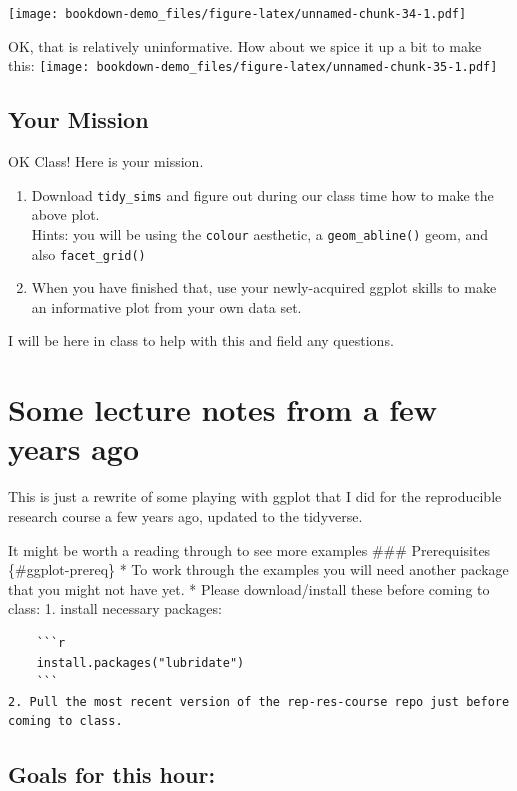 \documentclass[]{book}
\providecommand{\tightlist}{%
  \setlength{\itemsep}{0pt}\setlength{\parskip}{0pt}}
\theoremstyle{definition}
\theoremstyle{definition}
\theoremstyle{remark}
\begin{document}
\texttt{[image: bookdown-demo\_files/figure-latex/unnamed-chunk-34-1.pdf]}

OK, that is relatively uninformative. How about we spice it up a bit to
make this:
\texttt{[image: bookdown-demo\_files/figure-latex/unnamed-chunk-35-1.pdf]}

\subsection{Your Mission}\label{your-mission}

OK Class! Here is your mission.

\begin{enumerate}
\def\labelenumi{\arabic{enumi}.}
\tightlist
\item
  Download \texttt{tidy\_sims} and figure out during our class time how
  to make the above plot.\\
  Hints: you will be using the \texttt{colour} aesthetic, a
  \texttt{geom\_abline()} geom, and also \texttt{facet\_grid()}
\item
  When you have finished that, use your newly-acquired ggplot skills to
  make an informative plot from your own data set.
\end{enumerate}

I will be here in class to help with this and field any questions.

\section{Some lecture notes from a few years
ago}\label{some-lecture-notes-from-a-few-years-ago}

This is just a rewrite of some playing with ggplot that I did for the
reproducible research course a few years ago, updated to the tidyverse.

It might be worth a reading through to see more examples \#\#\#
Prerequisites \{\#ggplot-prereq\} * To work through the examples you
will need another package that you might not have yet. * Please
download/install these before coming to class: 1. install necessary
packages:

\begin{verbatim}
    ```r
    install.packages("lubridate")
    ```
2. Pull the most recent version of the rep-res-course repo just before coming to class.
\end{verbatim}

\subsection{Goals for this hour:}\label{goals-for-this-hour}
\end{document}
